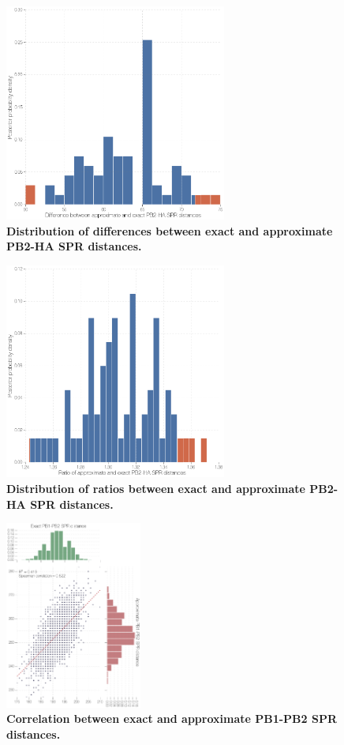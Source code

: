 \documentclass[11pt,oneside,letterpaper]{article}
\begin{document}
\begin{figure}
\centering  
\includegraphics[width=0.65\textwidth]  {supp_figures/InfB_supp_PB2-HA_hist.png}
\caption{\textbf{Distribution of differences between exact and approximate PB2-HA SPR distances.}}
\label{SPR_PB2-HA_difference}
\end{figure}

\begin{figure}
\centering  
\includegraphics[width=0.65\textwidth]  {supp_figures/InfB_supp_PB2-HA_hist2.png}
\caption{\textbf{Distribution of ratios between exact and approximate PB2-HA SPR distances.}}
\label{SPR_PB2-HA_ratio}
\end{figure}

\begin{figure}
\centering  
\includegraphics[width=0.4\textwidth]  {supp_figures/InfB_supp_PB1-PB2_corr.png}
\caption{\textbf{Correlation between exact and approximate PB1-PB2 SPR distances.}}
\label{SPR_PB1-PB2_correlation}
\end{figure}
\end{document}
